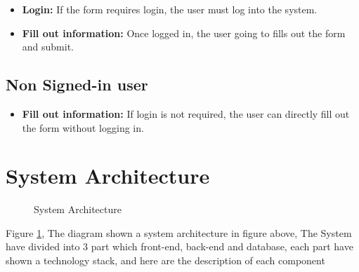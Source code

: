 \documentclass[12pt,oneside,openright,a4paper]{cpe-english-project}
\begin{document}
\begin{itemize}
\item  \textbf{Login:} If the form requires login, the user must log into the system.
\item  \textbf{Fill out information:} Once logged in, the user going to fills out the form and submit.
\end{itemize}


\subsection{Non Signed-in user}

\begin{itemize}
\item  \textbf{Fill out information:} If login is not required, the user can directly fill out the form without logging in.
\end{itemize}

\newpage

\section{System Architecture}

\begin{figure}[!h]
\centering
{}
\caption{System Architecture}\label{fig:system-arch}
\end{figure}

Figure \ref{fig:system-arch}, The diagram shown a system architecture in figure above, The System have divided into 3 part which front-end, back-end and database, each part have shown a technology stack, and here are the description of each component
\end{document}
